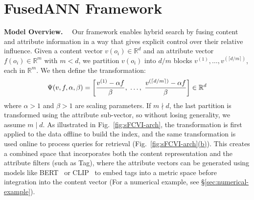 \documentclass[numbers,sort]{article}
\begin{document}
\section{FusedANN Framework}
\label{sec:fcvi-framework}
\textbf{Model Overview.}~~
Our framework enables hybrid search by fusing content and attribute information in a way that gives explicit control over their relative influence. Given a content vector $v(o_i) \in \mathbb{R}^d$ and an attribute vector $f(o_i) \in \mathbb{R}^m$ with $m < d$, we partition $v(o_i)$ into $d/m$ blocks $v^{(1)},\dots,v^{(\lceil d/m\rceil)}$, each in $\mathbb{R}^m$. We then define the transformation:
\begin{equation}
\small
   \Psi(v, f, \alpha, \beta) = \left[\frac{v^{(1)} - \alpha f}{\beta},~\ldots,~\frac{v^{(\lceil d/m\rceil)} - \alpha f}{\beta}\right] \in \mathbb{R}^d 
\end{equation}
where $\alpha > 1$ and $\beta > 1$ are scaling parameters. If $m \nmid d$, the last partition is transformed using the attribute sub-vector, so without losing generality, we assume $m \mid d$. As illustrated in Fig.~\ref{fig:sFCVI-arch}, the transformation is first applied to the data offline to build the index, and the same transformation is used online to process queries for retrieval (Fig.~\hyperref[fig:sFCVI-arch]{\ref*{fig:sFCVI-arch}(b)}). This creates a combined space that incorporates both the content representation and the attribute filters (such as Tag), where the attribute vectors can be generated using models like BERT~\cite{devlin2019bert} or CLIP~\cite{clip} to embed tags into a metric space before integration into the content vector (For a numerical example, see \hyperref[sec:numerical-example]{\S\ref*{sec:numerical-example}}).
\end{document}
